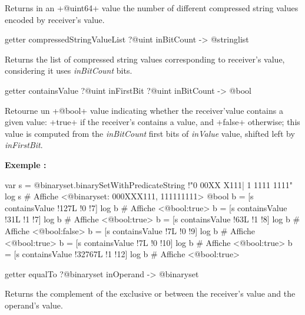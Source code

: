 Returns in an \ggs+@uint64+ value the number of different compressed string values encoded by receiver's value.




\begin{galgas}
getter compressedStringValueList ?@uint inBitCount -> @stringlist
\end{galgas}

Returns the list of compressed string values corresponding to receiver's value, considering it uses \emph{inBitCount} bits.











\begin{galgas}
getter containsValue ?@uint inFirstBit ?@uint inBitCount -> @bool
\end{galgas}


Retourne un \ggs+@bool+ value indicating whether the receiver'value contains a given value: \ggs+true+ if the receiver's contains a value, and \ggs+false+ otherwise; this value is computed from the \emph{inBitCount} first bits of \emph{inValue} value, shifted left by \emph{inFirstBit}.


\textbf{Exemple :}
\begin{galgas}
var s = @binaryset.binarySetWithPredicateString {!"0 00XX X111| 1 1111 1111"}
log s # Affiche <@binaryset: 000XXX111, 111111111>
@bool b = [s containsValue !127L !0 !7]
log b # Affiche <@bool:true>
b = [s containsValue !31L !1 !7]
log b # Affiche <@bool:true>
b = [s containsValue !63L !1 !8]
log b # Affiche <@bool:false>
b = [s containsValue !7L !0 !9]
log b # Affiche <@bool:true>
b = [s containsValue !7L !0 !10]
log b # Affiche <@bool:true>
b = [s containsValue !32767L !1 !12]
log b # Affiche <@bool:true>
\end{galgas}









\begin{galgas}
getter equalTo ?@binaryset inOperand -> @binaryset
\end{galgas}

Returns the complement of the exclusive or between the receiver's value and the operand's value.

